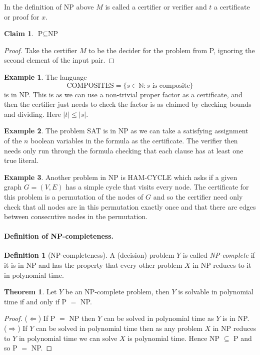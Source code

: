 \documentclass[11pt,a4paper]{article}
\theoremstyle{definition}
\newtheorem{thm}{Theorem}
\newtheorem{claim}{Claim}
\newtheorem{defn}{Definition}
\newtheorem*{ex}{Example}
\newcommand{\NN}{\mathbb{N}}
\begin{document}
In the definition of NP above $M$ is called a certifier or verifier and $t$ a certificate or proof for $x$.
\begin{claim}
$\text{P}\subseteq \text{NP}$
\end{claim}
\begin{proof}
Take the certifier $M$ to be the decider for the problem from P, ignoring the second element of the input pair.
\end{proof}

\begin{ex}
The language
\[
\text{COMPOSITES} = \{s\in \NN : s \text{ is composite}\}
\]
is in NP.
This is as we can use a non-trivial proper factor as a certificate, and then the certifier just needs to check the factor is as claimed by checking bounds and dividing.
Here $|t| \le |s|$.
\end{ex}

\begin{ex}
The problem SAT is in NP as we can take a satisfying assignment of the $n$ boolean variables in the formula as the certificate.
The verifier then needs only run through the formula checking that each clause has at least one true literal.
\end{ex}

\begin{ex}
Another problem in NP is HAM-CYCLE which asks if a given graph $G = (V,E)$ has a simple cycle that visits every node.
The certificate for this problem is a permutation of the nodes of $G$ and so the certifier need only check that all nodes are in this permutation exactly once and that there are edges between consecutive nodes in the permutation.
\end{ex}

\paragraph{Definition of NP-completeness.}
\begin{defn}[NP-completeness]
A (decision) problem $Y$ is called \emph{NP-complete} if it is in NP and has the property that every other problem $X$ in NP reduces to it in polynomial time.
\end{defn}

\begin{thm}
Let $Y$ be an NP-complete problem, then $Y$ is solvable in polynomial time if and only if P $=$ NP.
\end{thm}
\begin{proof}
($\Leftarrow$) If P $=$ NP then $Y$ can be solved in polynomial time as $Y$ is in NP.\\
($\Rightarrow$) If $Y$ can be solved in polynomial time then as any problem $X$ in NP reduces to $Y$ in polynomial time we can solve $X$ is polynomial time.
Hence NP $\subseteq$ P and so P $=$ NP.
\end{proof}
\end{document}
